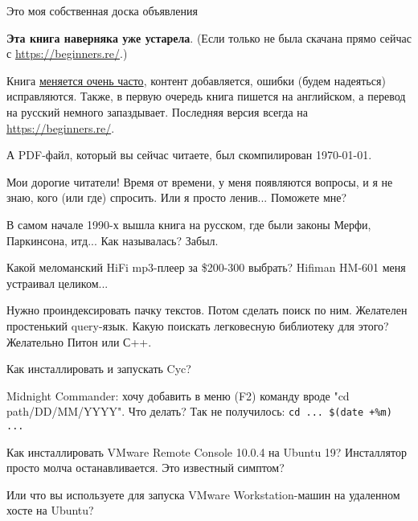 
\begin{center}
\LARGE{} Это моя собственная доска объявления \normalsize{}
\end{center}

\textbf{Эта книга наверняка уже устарела}.
(Если только не была скачана прямо сейчас с \url{https://beginners.re/}.)

Книга \href{https://github.com/DennisYurichev/RE-for-beginners/commits/master}{меняется очень часто},
контент добавляется, ошибки (будем надеяться) исправляются.
Также, в первую очередь книга пишется на английском, а перевод на русский немного запаздывает.
Последняя версия всегда на \url{https://beginners.re/}.

А PDF-файл, который вы сейчас читаете, был скомпилирован \today{}.

\myhrule{}

Мои дорогие читатели! Время от времени, у меня появляются вопросы, и я не знаю, кого (или где) спросить.
Или я просто ленив...
Поможете мне?

\myhrule{}

В самом начале 1990-х вышла книга на русском, где были законы Мерфи, Паркинсона, итд...
Как называлась?
Забыл.

\myhrule{}

Какой меломанский HiFi mp3-плеер за \$200-300 выбрать?
Hifiman HM-601 меня устраивал целиком...

\myhrule{}

Нужно проиндексировать пачку текстов. Потом сделать поиск по ним. Желателен простенький query-язык.
Какую поискать легковесную библиотеку для этого?
Желательно Питон или С++.

\myhrule{}

Как инсталлировать и запускать Cyc?

\myhrule{}

Midnight Commander: хочу добавить в меню (F2) команду вроде "cd path/DD/MM/YYYY".
Что делать?
Так не получилось: \verb|cd ... $(date +%m) ...|

\myhrule{}

Как инсталлировать VMware Remote Console 10.0.4 на Ubuntu 19? Инсталлятор просто молча останавливается. Это известный симптом?

Или что вы используете для запуска VMware Workstation-машин на удаленном хосте на Ubuntu?

\myhrule{}


